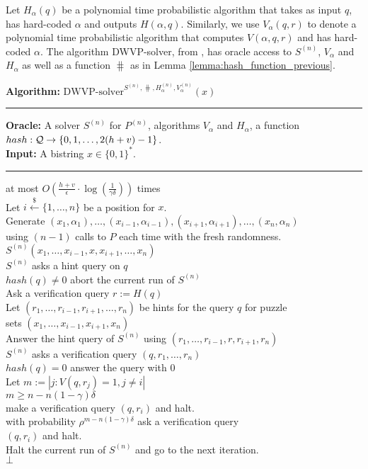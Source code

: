 Let $H_{\alpha}(q)$ be a polynomial time probabilistic algorithm that takes as input $q$, has hard-coded $\alpha$ and outputs $H(\alpha, q)$.
Similarly, we use $V_{\alpha}(q,r)$ to denote a polynomial time probabilistic algorithm that computes $V(\alpha, q, r)$ and has hard-coded $\alpha$.
The algorithm DWVP-solver, from \cite{dodis2009security}, has oracle access to $S^{(n)}$, $V_{\alpha}$ and $H_{\alpha}$ as well as a function $\hash$ as in Lemma \ref{lemma:hash_function_previous}.
%
\begin{codeblock}
  \textbf{Algorithm:} $\text{DWVP-solver}^{S^{(n)}, \hash, H_{\alpha}^{(n)}, V_{\alpha}^{(n)}}(x)$
  \medskip
  \hrule
  \textbf{Oracle:}  A solver $S^{(n)}$ for $P^{(n)}$, algorithms $V_{\alpha}$ and $H_{\alpha}$, a function $hash : \mathcal{Q} \rightarrow \{0,1, \dotsc, 2(h+v)-1\}$.\\
  \textbf{Input:} A bistring $x \in \{0,1\}^{*}$.
  \medskip\hrule
  \Repeat at most $O(\frac{h+v}{\epsilon} \cdot \log(\frac{1}{\gamma\delta}))$ times \\
  \IndI Let $i \xleftarrow{\$} \{1, \dotsc, n\}$ be a position for $x$.\\
  \IndI Generate $(x_1, \alpha_1), \dotsc, (x_{i-1}, \alpha_{i-1}), (x_{i+1}, \alpha_{i+1}), \dotsc, (x_n, \alpha_n)$ \\
  \IndI using $(n-1)$ calls to $P$ each time with the fresh randomness.\\
  \IndI \Run $S^{(n)}(x_1, \dotsc, x_{i-1}, x, x_{i+1}, \dotsc, x_n)$\\
  \IndII \If $S^{(n)}$ asks a hint query on $q$ \Then \\
  \IndIII \If $hash(q) \neq 0$ \Then abort the current run of $S^{(n)}$\\
  \IndIII Ask a verification query $r := H(q)$\\
  \IndIII Let $(r_1, \dotsc, r_{i-1}, r_{i+1}, \dotsc, r_{n})$ be hints for the query $q$ for puzzle\\
  \IndIII sets $(x_1, \dotsc, x_{i-1}, x_{i+1}, x_n)$\\
  \IndIII Answer the hint query of $S^{(n)}$ using $(r_1, \dots, r_{i-1}, r, r_{i+1}, r_n)$\\
  \IndII \If $S^{(n)}$ asks a verification query $(q, r_1, \dots, r_n)$ \Then \\
  \IndIII \If $hash(q) = 0$ \Then answer the query with $0$\\
  \IndIII Let $m := |j: V(q,r_j) = 1, j \neq i|$\\
  \IndIII \If $m \geq n - n(1-\gamma)\delta$ \Then \\
  \IndIIII make a verification query $(q, r_i)$ and halt.\\
  \IndIII \Else with probability $\rho^{m - n(1-\gamma)\delta}$ ask a verification query \\
  \IndIIII $(q, r_i)$ and halt. \\
  \IndIII Halt the current run of $S^{(n)}$ and go to the next iteration.\\
  \Return $\bot$
\end{codeblock}

